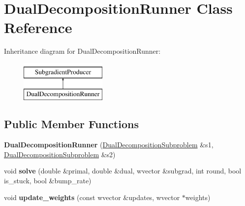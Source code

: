 \hypertarget{class_dual_decomposition_runner}{
\section{DualDecompositionRunner Class Reference}
\label{class_dual_decomposition_runner}
}
Inheritance diagram for DualDecompositionRunner:\begin{figure}[H]
\begin{center}
\leavevmode
\includegraphics[height=2cm]{class_dual_decomposition_runner}
\end{center}
\end{figure}
\subsection*{Public Member Functions}
\begin{DoxyCompactItemize}
\item 
\hypertarget{class_dual_decomposition_runner_ad0af4c8b1a73612770d329cf560af9d1}{
{\bfseries DualDecompositionRunner} (\hyperlink{class_dual_decomposition_subproblem}{DualDecompositionSubproblem} \&s1, \hyperlink{class_dual_decomposition_subproblem}{DualDecompositionSubproblem} \&s2)}
\label{class_dual_decomposition_runner_ad0af4c8b1a73612770d329cf560af9d1}

\item 
\hypertarget{class_dual_decomposition_runner_a4bcec895359acf32000d42155c4593ef}{
void {\bfseries solve} (double \&primal, double \&dual, wvector \&subgrad, int round, bool is\_\-stuck, bool \&bump\_\-rate)}
\label{class_dual_decomposition_runner_a4bcec895359acf32000d42155c4593ef}

\item 
\hypertarget{class_dual_decomposition_runner_a3cdf7ce33f6454f9fee9fb9c3287c5ac}{
void {\bfseries update\_\-weights} (const wvector \&updates, wvector $\ast$weights)}
\label{class_dual_decomposition_runner_a3cdf7ce33f6454f9fee9fb9c3287c5ac}

\end{DoxyCompactItemize}
